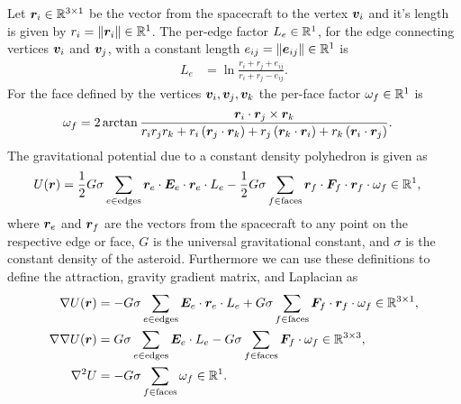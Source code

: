 \documentclass[]{aiaa-tc}%
\begin{document}
Let \( \bm{r}_i \in \mathbb{R}^{3 \times 1} \) be the vector from the spacecraft to the vertex \( \bm{v}_i \) and it's length is given by \( r_i = \left\| \bm{r}_i \right\| \in \mathbb{R}^{1} \).
The per-edge factor \( L_e \in \mathbb{R}^{1}\), for the edge connecting vertices \( \bm{v}_i \) and \( \bm{v}_j \), with a constant length \( e_{ij} = \left\| \bm{e}_{ij} \right\| \in \mathbb{R}^1\) is
\begin{align}\label{eq:edge_factor}
    L_e &= \ln \frac{r_i + r_j + e_{ij}}{r_i + r_j - e_{ij}}.
\end{align}
For the face defined by the vertices \( \bm{v}_i, \bm{v}_j, \bm{v}_k \) the per-face factor \( \omega_f \in \mathbb{R}^{1} \) is
\begin{align}\label{eq:face_factor}
    \omega_f &= 2 \arctan \frac{\bm{r}_i \cdot \bm{r}_j \times \bm{r}_k}{r_i r_j r_k + r_i \left( \bm{r}_j \cdot \bm{r}_k \right) + r_j \left( \bm{r}_k \cdot \bm{r}_i \right) + r_k \left( \bm{r}_i \cdot \bm{r}_j \right)} .
\end{align}
The gravitational potential due to a constant density polyhedron is given as
\begin{align}\label{eq:potential}
    U(\bm{r}) &= \frac{1}{2} G \sigma \sum_{e \in \text{edges}} \bm{r}_e \cdot \bm{E}_e \cdot \bm{r}_e \cdot L_e - \frac{1}{2}G \sigma \sum_{f \in \text{faces}} \bm{r}_f \cdot \bm{F}_f \cdot \bm{r}_f \cdot \omega_f \in \mathbb{R}^1,
\end{align}
where \( \bm{r}_e\) and \(\bm{r}_f \) are the vectors from the spacecraft to any point on the respective edge or face, \( G\) is the universal gravitational constant, and \( \sigma \) is the constant density of the asteroid.
Furthermore we can use these definitions to define the attraction, gravity gradient matrix, and Laplacian as
\begin{align}
    \nabla U ( \bm{r} ) &= -G \sigma \sum_{e \in \text{edges}} \bm{E}_e \cdot \bm{r}_e \cdot L_e + G \sigma \sum_{f \in \text{faces}} \bm{F}_f \cdot \bm{r}_f \cdot \omega_f \in \mathbb{R}^{3 \times 1} , \label{eq:attraction}\\
    \nabla \nabla U ( \bm{r} ) &= G \sigma \sum_{e \in \text{edges}} \bm{E}_e  \cdot L_e - G \sigma \sum_{f \in \text{faces}} \bm{F}_f \cdot \omega_f \in \mathbb{R}^{3 \times 3}, \label{eq:gradient_matrix}\\
    \nabla^2 U &= -G \sigma \sum_{f \in \text{faces}}  \omega_f \in \mathbb{R}^1 .\label{eq:laplacian}
\end{align}
\end{document}
